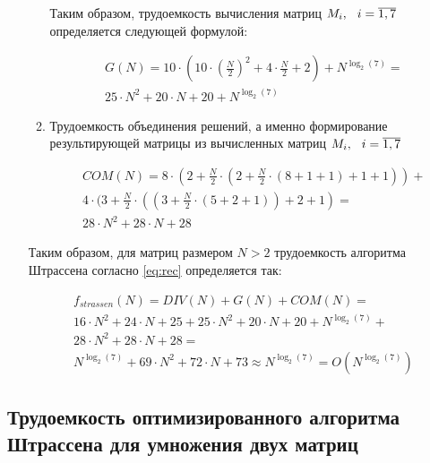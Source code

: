 \begin{itemize}[label=---]
\begin{enumerate}[label={\arabic*)}]
		Таким образом, трудоемкость вычисления матриц $M_i, \hspace{0.25cm} i = \overline{1, 7}$ определяется следующей формулой:
		
		\begin{equation}
			\label{eq:Gfinish}
			\begin{gathered}
				G(N) = 10 \cdot (10 \cdot (\frac{N}{2})^2 + 4 \cdot \frac{N}{2} + 2) + N^{\log_2(7)} = \\
				25 \cdot N^2 + 20 \cdot N + 20 + N^{\log_2(7)}
			\end{gathered}
		\end{equation}
		
		\item Трудоемкость объединения решений, а именно формирование результирующей матрицы из вычисленных матриц $M_i, \hspace{0.25cm} i = \overline{1, 7}$
		
		\begin{equation}
			\label{eq:com}
			\begin{gathered}
				COM(N) = 8 \cdot (2 + \frac{N}{2} \cdot (2 + \frac{N}{2} \cdot (8 + 1 + 1) + 1 + 1)) + \\
				4 \cdot (3 + \frac{N}{2} \cdot ((3 + \frac{N}{2} \cdot (5 + 2 + 1)) + 2 + 1) = \\
				28 \cdot N^2 + 28 \cdot N + 28
			\end{gathered}
		\end{equation}	
	\end{enumerate}
	
	Таким образом, для матриц размером $N > 2$ трудоемкость алгоритма Штрассена согласно \ref{eq:rec} определяется так:
	
	\begin{equation}
		\label{eq:com}
		\begin{gathered}
			f_{strassen}(N) = DIV(N) + G(N) + COM(N) = \\ 16 \cdot N^2 + 24 \cdot N + 25 + 25 \cdot N^2 + 20 \cdot N + 20 + N^{\log_2(7)} + \\
			28 \cdot N^2 + 28 \cdot N + 28 = \\
			N^{\log_2(7)} + 69 \cdot N^2 + 72 \cdot N + 73 \approx N^{\log_2(7)} = O(N^{\log_2(7)})
		\end{gathered}
	\end{equation}
\end{itemize}

\subsection{Трудоемкость оптимизированного алгоритма Штрассена для умножения двух матриц}

